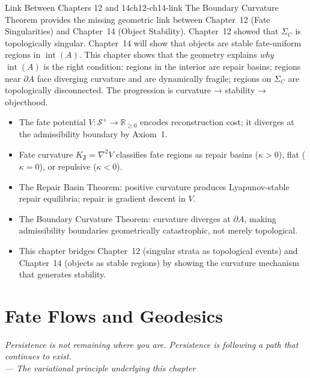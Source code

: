 \documentclass[12pt,twoside,openright]{book}
\newcommand{\fateMap}{\mathfrak{F}}
\newcommand{\fateSpace}{\mathcal{S}}
\newcommand{\strataC}{\Sigma_{C}}   %
\newcommand{\admRegion}{A}
\newenvironment{epigraph}[2]{%
  \vspace{1em}\begin{flushright}
  \begin{minipage}{0.72\textwidth}
  \itshape\small #1\\[0.4em]
  \upshape\footnotesize\sffamily\color{DistGray}--- #2
  \end{minipage}\end{flushright}\vspace{1.5em}}{}
\newenvironment{chapsummary}{%
  \begin{tcolorbox}[colback=DistBlue!5,colframe=DistBlue,
    title={\faBookOpen\enspace Summary},
    fonttitle=\sffamily\bfseries\color{white},
    attach boxed title to top left={yshift=-2mm,xshift=4mm},
    boxed title style={colback=DistBlue,rounded corners}]
  \begin{itemize}[nosep,leftmargin=*]}{%
  \end{itemize}\end{tcolorbox}}
\providecommand{\strataC}{\Sigma_{C}}
\providecommand{\fatePos}{\fateSpace^{+}}
\providecommand{\admRegion}{A}
\providecommand{\fatePot}{V}
\providecommand{\fateKurv}{K_{\fateMap}}
\begin{document}
\begin{remark}{Link Between Chapters 12 and 14}{ch12-ch14-link}
The Boundary Curvature Theorem provides the missing geometric
link between Chapter~12 (Fate Singularities) and Chapter~14
(Object Stability). Chapter~12 showed that $\strataC$ is
topologically singular. Chapter~14 will show that objects are
stable fate-uniform regions in $\operatorname{int}(\admRegion)$.
This chapter shows that the geometry explains \emph{why}
$\operatorname{int}(\admRegion)$ is the right condition: regions
in the interior are repair basins; regions near $\partial\admRegion$
face diverging curvature and are dynamically fragile; regions
on $\strataC$ are topologically disconnected. The progression
is curvature → stability → objecthood.
\end{remark}

\begin{chapsummary}
\item The fate potential $\fatePot:\fatePos\to\mathbb{R}_{\ge0}$
  encodes reconstruction cost; it diverges at the admissibility
  boundary by Axiom~1.
\item Fate curvature $\fateKurv=\nabla^2\fatePot$ classifies fate
  regions as repair basins ($\kappa>0$), flat ($\kappa=0$),
  or repulsive ($\kappa<0$).
\item The Repair Basin Theorem: positive curvature produces
  Lyapunov-stable repair equilibria; repair is gradient descent
  in $\fatePot$.
\item The Boundary Curvature Theorem: curvature diverges at
  $\partial\admRegion$, making admissibility boundaries
  geometrically catastrophic, not merely topological.
\item This chapter bridges Chapter~12 (singular strata as
  topological events) and Chapter~14 (objects as stable regions)
  by showing the curvature mechanism that generates stability.
\end{chapsummary}


\chapter{Fate Flows and Geodesics}
\label{ch:fate-geodesics}

\begin{epigraph}{Persistence is not remaining where you are.
  Persistence is following a path that continues to exist.}%
  {The variational principle underlying this chapter}
\end{epigraph}
\end{document}
